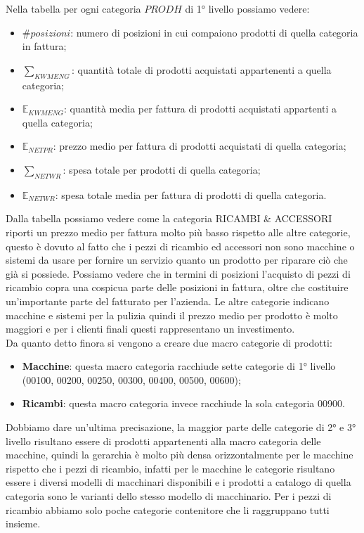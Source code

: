 Nella tabella per ogni categoria $PRODH$ di 1° livello possiamo vedere:
\begin{itemize}
	\item $\#posizioni$: numero di posizioni in cui compaiono prodotti di quella categoria in fattura;
	\item $\sum_{KWMENG}$: quantità totale di prodotti acquistati appartenenti a quella categoria;
	\item $\mathbb{E}_{KWMENG}$: quantità media per fattura di prodotti acquistati appartenti a quella categoria;
	\item $\mathbb{E}_{NETPR}$: prezzo medio per fattura di prodotti acquistati di quella categoria;
	\item $\sum_{NETWR}$: spesa totale per prodotti di quella categoria;
	\item $\mathbb{E}_{NETWR}$: spesa totale media per fattura di prodotti di quella categoria.
\end{itemize}
Dalla tabella possiamo vedere come la categoria RICAMBI \& ACCESSORI riporti un prezzo medio per fattura molto più basso rispetto alle altre categorie, questo è dovuto al fatto che i pezzi di ricambio ed accessori non sono macchine o sistemi da usare per fornire un servizio quanto un prodotto per riparare ciò che già si possiede. Possiamo vedere che in termini di posizioni l'acquisto di pezzi di ricambio copra una cospicua parte delle posizioni in fattura, oltre che costituire un'importante parte del fatturato per l'azienda. Le altre categorie indicano macchine e sistemi per la pulizia quindi il prezzo medio per prodotto è molto maggiori e per i clienti finali questi rappresentano un investimento.\\
Da quanto detto finora si vengono a creare due macro categorie di prodotti:
\begin{itemize}
	\item \textbf{Macchine}: questa macro categoria racchiude sette categorie di 1° livello (00100, 00200, 00250, 00300, 00400, 00500, 00600);
	\item \textbf{Ricambi}: questa macro categoria invece racchiude la sola categoria 00900.
\end{itemize}

Dobbiamo dare un'ultima precisazione, la maggior parte delle categorie di 2° e 3° livello risultano essere di prodotti appartenenti alla macro categoria delle macchine, quindi la gerarchia è molto più densa orizzontalmente per le macchine rispetto che i pezzi di ricambio, infatti per le macchine le categorie risultano essere i diversi modelli di macchinari disponibili e i prodotti a catalogo di quella categoria sono le varianti dello stesso modello di macchinario. Per i pezzi di ricambio abbiamo solo poche categorie contenitore che li raggruppano tutti insieme.

